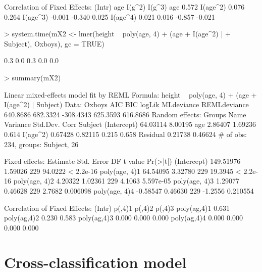 \documentclass[12pt]{article}
\begin{document}
\begin{Schunk}
\begin{Soutput}
Correlation of Fixed Effects:
         (Intr) age    I(g^2) I(g^3)
age       0.572                     
I(age^2)  0.076  0.264              
I(age^3) -0.001 -0.340  0.025       
I(age^4)  0.021  0.016 -0.857 -0.021
\end{Soutput}
\begin{Sinput}
> system.time(mX2 <- lmer(height ~ poly(age, 4) + (age + I(age^2) | 
+     Subject), Oxboys), gc = TRUE)
\end{Sinput}
\begin{Soutput}
[1] 0.3 0.0 0.3 0.0 0.0
\end{Soutput}
\begin{Sinput}
> summary(mX2)
\end{Sinput}
\begin{Soutput}
Linear mixed-effects model fit by REML
Formula: height ~ poly(age, 4) + (age + I(age^2) | Subject) 
   Data: Oxboys 
      AIC      BIC    logLik MLdeviance REMLdeviance
 640.8686 682.3324 -308.4343   625.3593     616.8686
Random effects:
 Groups   Name        Variance Std.Dev. Corr        
 Subject  (Intercept) 64.03114 8.00195              
          age          2.86407 1.69236  0.614       
          I(age^2)     0.67428 0.82115  0.215 0.658 
 Residual              0.21738 0.46624              
# of obs: 234, groups: Subject, 26

Fixed effects:
               Estimate Std. Error  DF t value  Pr(>|t|)
(Intercept)   149.51976    1.59026 229 94.0222 < 2.2e-16
poly(age, 4)1  64.54095    3.32780 229 19.3945 < 2.2e-16
poly(age, 4)2   4.20322    1.02361 229  4.1063 5.597e-05
poly(age, 4)3   1.29077    0.46628 229  2.7682  0.006098
poly(age, 4)4  -0.58547    0.46630 229 -1.2556  0.210554

Correlation of Fixed Effects:
            (Intr) p(,4)1 p(,4)2 p(,4)3
poly(ag,4)1 0.631                      
poly(ag,4)2 0.230  0.583               
poly(ag,4)3 0.000  0.000  0.000        
poly(ag,4)4 0.000  0.000  0.000  0.000 
\end{Soutput}
\end{Schunk}

\section{Cross-classification model}
\label{sec:CrossClassified}
\end{document}
